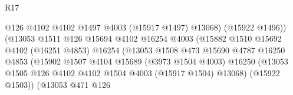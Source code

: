 \begin{lexlean}{R17}
\begin{coremodule}
                                              @126
                                              @4102
                                              @4102
                                              @1497
                                              @4003
                                              (@15917 @1497)
                                              @13068)
                                            (@15922 @1496))
                                          (@13053
                                            @1511
                                            @126
                                            @15694
                                            @4102
                                            @16254
                                            @4003
                                            (@15882
                                              @1510
                                              @15692
                                              @4102
                                              (@16251 @4853)
                                              @16254
                                              (@13053
                                                @1508
                                                @473
                                                @15690
                                                @4787
                                                @16250
                                                @4853
                                                (@15902
                                                  @1507
                                                  @4104
                                                  @15689
                                                  (@3973 @1504 @4003)
                                                  @16250
                                                  (@13053
                                                    @1505
                                                    @126
                                                    @4102
                                                    @4102
                                                    @1504
                                                    @4003
                                                    (@15917 @1504)
                                                    @13068)
                                                  (@15922 @1503))
                                                (@13053
                                                  @471
                                                  @126

\end{coremodule}
\end{lexlean}
